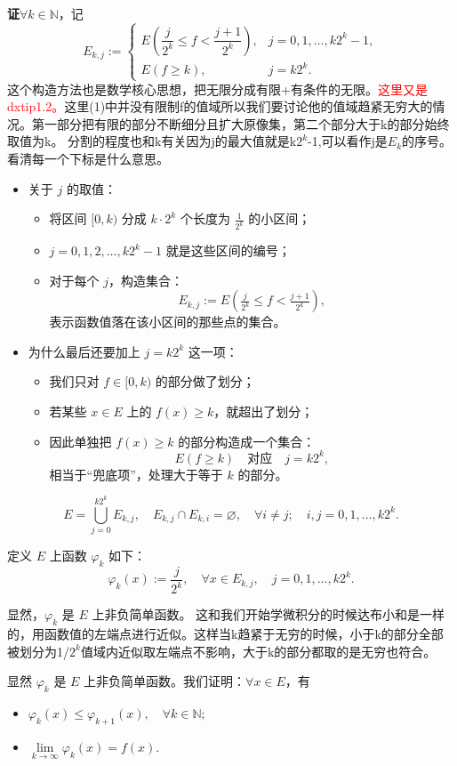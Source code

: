 \documentclass[lang=cn,10pt]{elegantbook}
\begin{document}
\textbf{证}\quad $\forall k \in \mathbb{N}$，记
\[
E_{k,j} := 
\begin{cases}
E\left( \dfrac{j}{2^k} \leq f < \dfrac{j+1}{2^k} \right), & j = 0, 1, \dots, k2^k - 1, \\
E(f \geq k), & j = k2^k.
\end{cases}
\]
这个构造方法也是数学核心思想，把无限分成有限+有条件的无限。\textcolor{red}{这里又是dxtip1.2。}这里(1)中并没有限制f的值域所以我们要讨论他的值域趋紧无穷大的情况。第一部分把有限的部分不断细分且扩大原像集，第二个部分大于k的部分始终取值为k。
分割的程度也和k有关因为j的最大值就是k$2^k$-1,可以看作j是$E_k$的序号。看清每一个下标是什么意思。
\begin{itemize}
  \item 关于 $j$ 的取值：
  \begin{itemize}
    \item 将区间 $[0, k)$ 分成 $k \cdot 2^k$ 个长度为 $\tfrac{1}{2^k}$ 的小区间；
    \item $j = 0, 1, 2, \dots, k2^k - 1$ 就是这些区间的编号；
    \item 对于每个 $j$，构造集合：
    \[
    E_{k,j} := E\left( \tfrac{j}{2^k} \leq f < \tfrac{j+1}{2^k} \right),
    \]
    表示函数值落在该小区间的那些点的集合。
  \end{itemize}

  \item 为什么最后还要加上 $j = k2^k$ 这一项：
  \begin{itemize}
    \item 我们只对 $f \in [0, k)$ 的部分做了划分；
    \item 若某些 $x \in E$ 上的 $f(x) \geq k$，就超出了划分；
    \item 因此单独把 $f(x) \geq k$ 的部分构造成一个集合：
    \[
    E(f \geq k) \quad \text{对应} \quad j = k2^k,
    \]
    相当于“兜底项”，处理大于等于 $k$ 的部分。
  \end{itemize}
\end{itemize}
\[
E = \bigcup_{j=0}^{k 2^k} E_{k,j}, \quad E_{k,j} \cap E_{k,i} = \varnothing, \quad \forall i \ne j; \quad i,j = 0,1,\dots,k 2^k.
\]

定义 $E$ 上函数 $\varphi_k$ 如下：
\[
\varphi_k(x) := \frac{j}{2^k}, \quad \forall x \in E_{k,j}, \quad j = 0,1,\dots,k 2^k.
\]
\begin{dxtips}
    

显然，$\varphi_k$ 是 $E$ 上非负简单函数。
这和我们开始学微积分的时候达布小和是一样的，用函数值的左端点进行近似。这样当k趋紧于无穷的时候，小于k的部分全部被划分为1/$2^k$值域内近似取左端点不影响，大于k的部分都取的是无穷也符合。
\end{dxtips}
显然 $\varphi_k$ 是 $E$ 上非负简单函数。我们证明：$\forall x \in E$，有
\begin{itemize}
    \item[(a)] $\varphi_k(x) \leq \varphi_{k+1}(x), \quad \forall k \in \mathbb{N};$
    \item[(b)] $\lim\limits_{k \to \infty} \varphi_k(x) = f(x)$.
\end{itemize}
\end{document}
